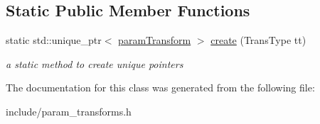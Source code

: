 \subsection*{Static Public Member Functions}
\begin{DoxyCompactItemize}
\item 
\mbox{\label{classparamTransform_a3cef2dd407ed30c66ff9a5cab8516a3c}} 
static std\+::unique\+\_\+ptr$<$ \hyperlink{classparamTransform}{param\+Transform} $>$ \hyperlink{classparamTransform_a3cef2dd407ed30c66ff9a5cab8516a3c}{create} (Trans\+Type tt)
\begin{DoxyCompactList}\small\item\em a static method to create unique pointers \end{DoxyCompactList}\end{DoxyCompactItemize}


The documentation for this class was generated from the following file\+:\begin{DoxyCompactItemize}
\item 
include/param\+\_\+transforms.\+h\end{DoxyCompactItemize}
